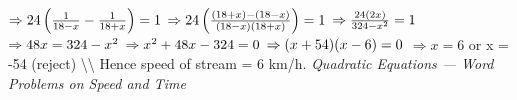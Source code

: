 \documentclass[12pt,a4paper]{exam}
\begin{document}
\begin{questions}
 $\Rightarrow 24\left(\frac{1}{18-x} - \frac{1}{18+x}\right) = 1 \\$
 $\Rightarrow 24\left(\frac{(18+x)-(18-x)}{(18-x)(18+x)}\right) = 1 \\$
 $\Rightarrow \frac{24(2x)}{324 - x^2} = 1 \\$
 $\Rightarrow 48x = 324 - x^2 \\$
 $\Rightarrow x^2 + 48x - 324 = 0 \\$
 $\Rightarrow (x+54)(x-6)=0 \\$
 $\Rightarrow x = 6$  or  x = -54  (reject) \textbackslash{}\textbackslash{}
Hence speed of stream =  6  km/h.
\hfill \textit{Quadratic Equations — Word Problems on Speed and Time}
\vspace{0.3cm}

\end{questions}
\end{document}
